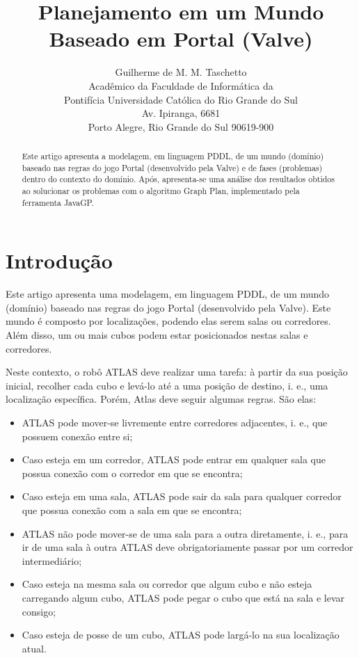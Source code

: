 \documentclass[letterpaper]{article}
\begin{document}
\title{Planejamento em um Mundo\\Baseado em Portal (Valve)}
\author{Guilherme de M. M. Taschetto\\
Acadêmico da Faculdade de Informática da\\
Pontifícia Universidade Católica do Rio Grande do Sul\\
Av. Ipiranga, 6681\\
Porto Alegre, Rio Grande do Sul 90619-900}

\maketitle
\begin{abstract}
Este artigo apresenta a modelagem, em linguagem PDDL, de um mundo (domínio) baseado nas regras do jogo Portal 
(desenvolvido pela Valve) e de fases (problemas) dentro do contexto do domínio. Após, apresenta-se uma análise dos 
resultados obtidos ao solucionar os problemas com o algoritmo Graph Plan, implementado pela ferramenta JavaGP.
\end{abstract}

\section{Introdução}

Este artigo apresenta uma modelagem, em linguagem PDDL, de um mundo (domínio) baseado nas regras do jogo Portal 
(desenvolvido pela Valve). Este mundo é composto por localizações, podendo elas serem salas ou corredores. Além disso, 
um ou mais cubos podem estar posicionados nestas salas e corredores.

Neste contexto, o robô ATLAS deve realizar uma tarefa: à partir da sua posição inicial, recolher cada cubo e levá-lo 
até a uma posição de destino, i. e., uma localização específica. Porém, Atlas deve seguir algumas regras. São elas:

\begin{itemize}
\item ATLAS pode mover-se livremente entre corredores adjacentes, i. e., que possuem conexão entre si;
\item Caso esteja em um corredor, ATLAS pode entrar em qualquer sala que possua conexão com o corredor em que se encontra;
\item Caso esteja em uma sala, ATLAS pode sair da sala para qualquer corredor que possua conexão com a sala em que se encontra;
\item ATLAS não pode mover-se de uma sala para a outra diretamente, i. e., para ir de uma sala à outra ATLAS deve obrigatoriamente passar por um corredor intermediário;
\item Caso esteja na mesma sala ou corredor que algum cubo e não esteja carregando algum cubo, ATLAS pode pegar o cubo que está na sala e levar consigo;
\item Caso esteja de posse de um cubo, ATLAS pode largá-lo na sua localização atual.
\end{itemize}
\end{document}
